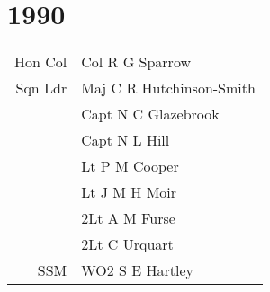 \chapter*{1990}

\vspace*{10mm}

\begin{center}
  \begin{tabular}{rl}
    Hon Col & Col R G Sparrow \\
    Sqn Ldr & Maj C R Hutchinson-Smith \\
    & Capt N C Glazebrook \\
    & Capt N L Hill \\
    & Lt P M Cooper \\
    & Lt J M H Moir \\
    & 2Lt A M Furse \\
    & 2Lt C Urquart \\
    SSM & WO2 S E Hartley \\
  \end{tabular}
\end{center}

\vspace*{10mm}

